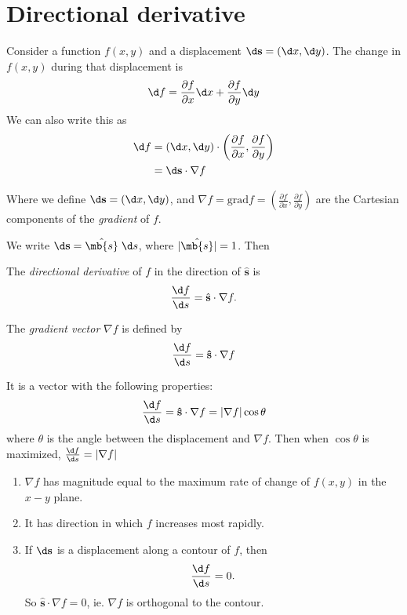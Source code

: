 \documentclass[a4paper]{article}
\begin{document}
  \section{Directional derivative}
  \label{sec:directional-derivative}
  Consider a function $f(x, y)$ and a displacement $\d\mathbf{s} = (\d x, \d y)$. The change in $f(x, y)$ during that displacement is 
  \[
    \d f = \frac{\partial f}{\partial x}\d x + \frac{\partial f}{\partial y}\d y
  \]
  We can also write this as 
  \begin{align*}
    \d f &= (\d x, \d y)\cdot \left(\frac{\partial f}{\partial x}, \frac{\partial f}{\partial y}\right)\\
    &= \d\mathbf{s}\cdot \nabla f
  \end{align*}

  Where we define $\d \mathbf{s} = (\d x, \d y)$, and $\nabla f = \mathrm{grad}f = \left(\frac{\partial f}{\partial x}, \frac{\partial f}{\partial y}\right)$ are the Cartesian components of the \emph{gradient} of $f$.

  We write $\d\mathbf{s} = \hat{\mb{s}}\;\d s$, where $|\hat{\mb{s}}| = 1$. Then
  \begin{defi}
    The \emph{directional derivative} of $f$ in the direction of $\hat{\mathbf{s}}$ is
    \[
      \frac{\d f}{\d s} = \hat{\mathbf{s}}\cdot \nabla f.
    \]
  \end{defi}

  \begin{defi}
    The \emph{gradient vector} $\nabla f$ is defined by
    \[
      \frac{\d f}{\d s} = \mathbf{\hat{s}}\cdot \nabla f
    \]
  \end{defi}
  It is a vector with the following properties: 
  \[
    \frac{\d f}{\d s} = \mathbf{\hat{s}}\cdot \nabla f = |\nabla f| \cos \theta
  \]
  where $\theta$ is the angle between the displacement and $\nabla f$. Then when $\cos\theta$ is maximized, $\frac{\d f}{\d s} = |\nabla f|$

  \begin{enumerate}
    \item $\nabla f$ has magnitude equal to the maximum rate of change of $f(x, y)$ in the $x-y$ plane.
    \item It has direction in which $f$ increases most rapidly.
    \item If $\d\mathbf{s}$ is a displacement along a contour of $f$, then
      \[
        \frac{\d f}{\d s} = 0.
      \]
      So $\mathbf{\hat{s}}\cdot \nabla f = 0$, ie. $\nabla f$ is orthogonal to the contour.
  \end{enumerate}
\end{document}
